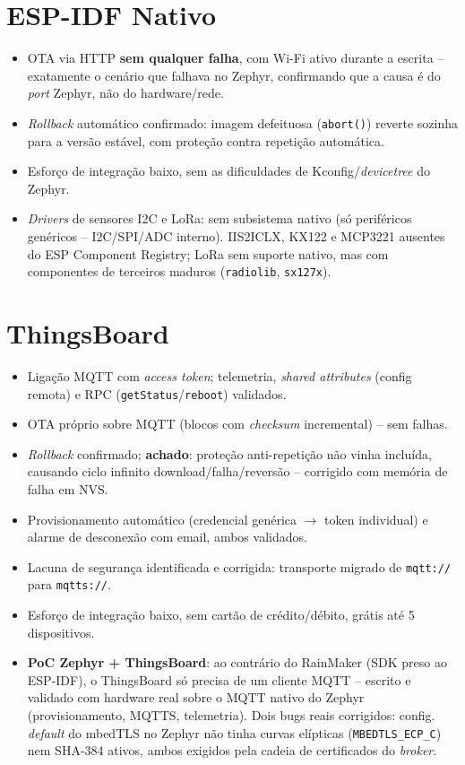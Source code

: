 \documentclass[a4paper,11pt]{article}
\begin{document}
\section{ESP-IDF Nativo}
\begin{itemize}
    \item OTA via HTTP \textbf{sem qualquer falha}, com Wi-Fi ativo durante a escrita -- exatamente o cenário que falhava no Zephyr, confirmando que a causa é do \textit{port} Zephyr, não do hardware/rede.
    \item \textit{Rollback} automático confirmado: imagem defeituosa (\texttt{abort()}) reverte sozinha para a versão estável, com proteção contra repetição automática.
    \item Esforço de integração baixo, sem as dificuldades de Kconfig/\textit{devicetree} do Zephyr.
    \item \textit{Drivers} de sensores I2C e LoRa: sem subsistema nativo (só periféricos genéricos -- I2C/SPI/ADC interno). IIS2ICLX, KX122 e MCP3221 ausentes do ESP Component Registry; LoRa sem suporte nativo, mas com componentes de terceiros maduros (\texttt{radiolib}, \texttt{sx127x}).
\end{itemize}
\newpage
\section{ThingsBoard}
\begin{itemize}
    \item Ligação MQTT com \textit{access token}; telemetria, \textit{shared attributes} (config remota) e RPC (\texttt{getStatus}/\texttt{reboot}) validados.
    \item OTA próprio sobre MQTT (blocos com \textit{checksum} incremental) -- sem falhas.
    \item \textit{Rollback} confirmado; \textbf{achado}: proteção anti-repetição não vinha incluída, causando ciclo infinito download/falha/reversão -- corrigido com memória de falha em NVS.
    \item Provisionamento automático (credencial genérica $\rightarrow$ token individual) e alarme de desconexão com email, ambos validados.
    \item Lacuna de segurança identificada e corrigida: transporte migrado de \texttt{mqtt://} para \texttt{mqtts://}.
    \item Esforço de integração baixo, sem cartão de crédito/débito, grátis até 5 dispositivos.
    \item \textbf{PoC Zephyr + ThingsBoard}: ao contrário do RainMaker (SDK preso ao ESP-IDF), o ThingsBoard só precisa de um cliente MQTT -- escrito e validado com hardware real sobre o MQTT nativo do Zephyr (provisionamento, MQTTS, telemetria). Dois bugs reais corrigidos: config. \textit{default} do mbedTLS no Zephyr não tinha curvas elípticas (\texttt{MBEDTLS\_ECP\_C}) nem SHA-384 ativos, ambos exigidos pela cadeia de certificados do \textit{broker}.
\end{itemize}
\end{document}
